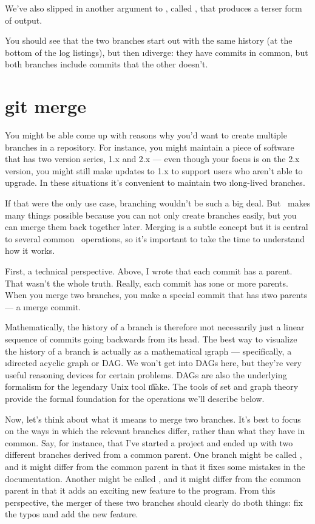 \documentclass[letterpaper,12pt,titlepage,twoside]{article}
\begin{document}
We've also slipped in another argument to , called ,
that produces a terser form of output.

You should see that the two branches start out with the same history (at the
bottom of the log listings), but then \i{diverge}: they have commits in
common, but both branches include commits that the other doesn't.


\section{git merge}

You might be able come up with reasons why you'd want to create multiple
branches in a repository. For instance, you might maintain a piece of software
that has two version series, 1.x and 2.x --- even though your focus is on the
2.x version, you might still make updates to 1.x to support users who aren't
able to upgrade. In these situations it's convenient to maintain two
\i{long-lived branches}.

If that were the only use case, branching wouldn't be such a big deal. But
\git\ makes many things possible because you can not only create branches
easily, but you can \i{merge} them back together later. Merging is a subtle
concept but it is central to several common \git\ operations, so it's
important to take the time to understand how it works.

First, a technical perspective. Above, I wrote that each commit has a parent.
That wasn't the whole truth. Really, each commit has \i{one or more parents}.
When you merge two branches, you make a special commit that has \i{two}
parents --- a \i{merge commit}.

Mathematically, the history of a branch is therefore \i{not} necessarily just
a linear sequence of commits going backwards from its head. The best way to
visualize the history of a branch is actually as a mathematical \i{graph} ---
specifically, a \i{directed acyclic graph} or DAG. We won't get into DAGs
here, but they're very useful reasoning devices for certain problems. DAGs are
also the underlying formalism for the legendary Unix tool \t{make}. The tools
of set and graph theory provide the formal foundation for the operations we'll
describe below.

Now, let's think about what it \i{means} to merge two branches. It's best to
focus on the ways in which the relevant branches differ, rather than what they
have in common. Say, for instance, that I've started a project and ended up
with two different branches derived from a common parent. One branch might be
called , and it might differ from the common parent in that it
fixes some mistakes in the documentation. Another might be called
, and it might differ from the common parent in that it adds an
exciting new feature to the program. From this perspective, the merger of
these two branches should clearly do \i{both} things: fix the typos \i{and}
add the new feature.
\end{document}
